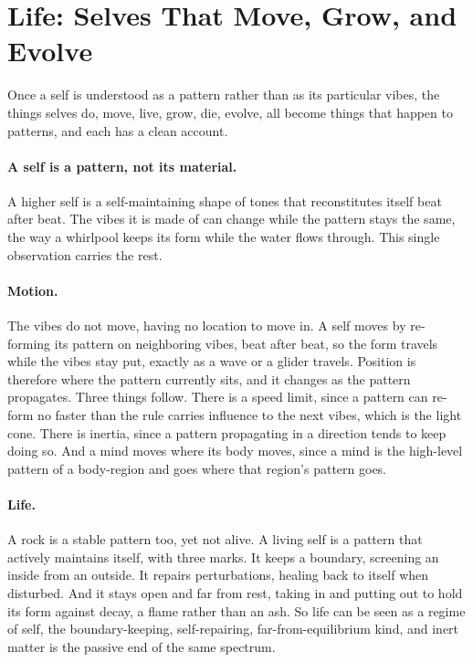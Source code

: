 \section{Life: Selves That Move, Grow, and Evolve}
\label{sec:life}

Once a self is understood as a pattern rather than as its particular vibes, the things selves
do, move, live, grow, die, evolve, all become things that happen to patterns, and each has a
clean account.

\paragraph{A self is a pattern, not its material.}
A higher self is a self-maintaining shape of tones that reconstitutes itself beat after beat.
The vibes it is made of can change while the pattern stays the same, the way a whirlpool keeps
its form while the water flows through. This single observation carries the rest.

\paragraph{Motion.}
The vibes do not move, having no location to move in. A self moves by re-forming its pattern
on neighboring vibes, beat after beat, so the form travels while the vibes stay put, exactly
as a wave or a glider travels. Position is therefore where the pattern currently sits, and it
changes as the pattern propagates. Three things follow. There is a speed limit, since a pattern
can re-form no faster than the rule carries influence to the next vibes, which is the light
cone. There is inertia, since a pattern propagating in a direction tends to keep doing so. And
a mind moves where its body moves, since a mind is the high-level pattern of a body-region and
goes where that region's pattern goes.

\paragraph{Life.}
A rock is a stable pattern too, yet not alive. A living self is a pattern that actively
maintains itself, with three marks. It keeps a boundary, screening an inside from an outside. It
repairs perturbations, healing back to itself when disturbed. And it stays open and far from
rest, taking in and putting out to hold its form against decay, a flame rather than an ash. So
life can be seen as a regime of self, the boundary-keeping, self-repairing, far-from-equilibrium kind, and
inert matter is the passive end of the same spectrum.

